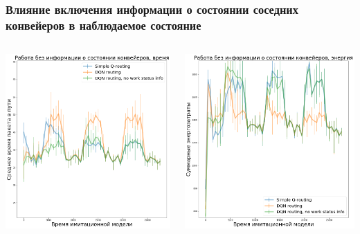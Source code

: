 \documentclass{beamer}
\begin{document}
\begin{frame}
  \frametitle{Влияние включения информации о состоянии соседних конвейеров в
    наблюдаемое состояние}
  \begin{columns}
    \begin{column}{0.5\textwidth}
      \includegraphics[width=\textwidth]{experiment-conveyors-en1-time-no-ws-tall}
    \end{column}
    \begin{column}{0.5\textwidth}
      \includegraphics[width=\textwidth]{experiment-conveyors-en1-energy-no-ws-tall}
    \end{column}
  \end{columns}
\end{frame}
\end{document}
